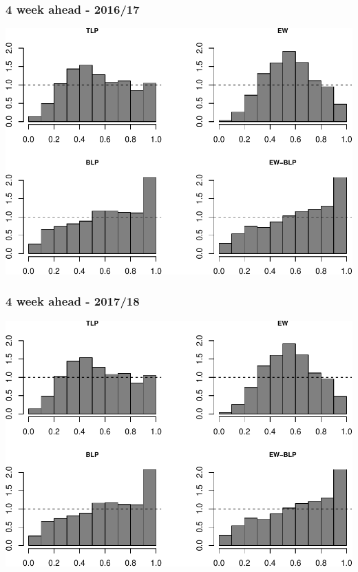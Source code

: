 \documentclass[]{article}
\begin{document}
\hypertarget{week-ahead---201617-3}{%
\subsubsection{4 week ahead - 2016/17}\label{week-ahead---201617-3}}

\includegraphics{BLPcalibration_app_files/figure-latex/unnamed-chunk-12-1.pdf}

\hypertarget{week-ahead---201718-3}{%
\subsubsection{4 week ahead - 2017/18}\label{week-ahead---201718-3}}

\includegraphics{BLPcalibration_app_files/figure-latex/unnamed-chunk-13-1.pdf}
\end{document}
